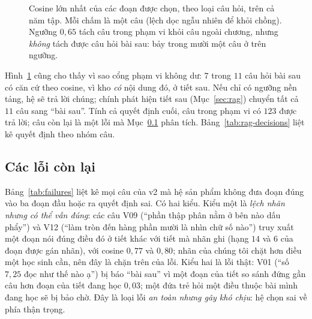 \begin{figure}[tp]
\centering

\caption{Cosine lớn nhất của các đoạn được chọn, theo loại câu hỏi, trên cả năm tập. Mỗi chấm là một câu (lệch dọc ngẫu nhiên để khỏi chồng). Ngưỡng $0{,}65$ tách câu trong phạm vi khỏi câu ngoài chương, nhưng \emph{không} tách được câu hỏi bài sau: bảy trong mười một câu ở trên ngưỡng.}
\label{fig:grounding}
\end{figure}

Hình~\ref{fig:grounding} cũng cho thấy vì sao cổng phạm vi không dư: $7$ trong $11$ câu hỏi bài sau có căn cứ theo cosine, vì kho \emph{có} nội dung đó, ở tiết sau. Nếu chỉ có ngưỡng nền tảng, hệ sẽ trả lời chúng; chính phát hiện tiết sau (Mục~\ref{sec:rag}) chuyển tất cả $11$ câu sang ``bài sau''. Tính cả quyết định cuối, \NQuestionsInScope{} câu trong phạm vi có $123$ được trả lời; câu còn lại là một lỗi mà Mục~\ref{sec:failures} phân tích. Bảng~\ref{tab:rag-decisions} liệt kê quyết định theo nhóm câu.

\begin{table}[tp]
\centering
\caption{Quyết định cuối cùng của gia sư theo nhóm câu hỏi (cấu hình sản phẩm). ``Đúng'': câu trong phạm vi được trả lời; câu bài sau được báo ``bài sau''; câu ngoài chương không được trả lời.}
\label{tab:rag-decisions}

\end{table}

\subsection{Các lỗi còn lại}\label{sec:failures}
Bảng~\ref{tab:failures} liệt kê mọi câu của v2 mà hệ sản phẩm không đưa đoạn đúng vào ba đoạn đầu hoặc ra quyết định sai. Có hai kiểu. Kiểu một là \emph{lệch nhãn nhưng có thể vẫn đúng}: các câu V09 (``phần thập phân nằm ở bên nào dấu phẩy'') và V12 (``làm tròn đến hàng phần mười là nhìn chữ số nào'') truy xuất một đoạn nói đúng điều đó ở tiết khác với tiết mà nhãn ghi (hạng $14$ và $6$ của đoạn được gán nhãn), với cosine $0{,}77$ và $0{,}80$; nhãn của chúng tôi chặt hơn điều một học sinh cần, nên đây là chặn trên của lỗi. Kiểu hai là lỗi thật: V01 (``số $7{,}25$ đọc như thế nào ạ'') bị báo ``bài sau'' vì một đoạn của tiết so sánh đứng gần câu hơn đoạn của tiết đang học $0{,}03$; một đứa trẻ hỏi một điều thuộc bài mình đang học sẽ bị bảo chờ. Đây là loại lỗi \emph{an toàn nhưng gây khó chịu}: hệ chọn sai về phía thận trọng.

\begin{table}[tp]
\centering
\caption{Các câu của tập v2 mà cấu hình sản phẩm không đưa đoạn đúng vào ba đoạn đầu hoặc quyết định chưa đúng. ``Hạng'': vị trí của đoạn đúng đầu tiên trong toàn bảng xếp hạng.}
\label{tab:failures}

\end{table}

